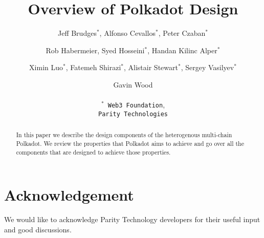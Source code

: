\documentclass{article}
\title{Overview of Polkadot Design}
\author{
  Jeff Brudges$^*$, Alfonso Cevallos$^*$, Peter Czaban$^*$\\
  \and
  Rob Habermeier, Syed Hosseini$^*$, Handan Kilinc Alper$^*$\\
  \and
  Ximin Luo$^*$, Fatemeh Shirazi$^*$, Alistair Stewart$^*$, Sergey Vasilyev$^*$\\
  \and
  Gavin Wood\\
  \\
  \texttt{$^*$ Web3 Foundation},\\
  \texttt{Parity Technologies}
}
\begin{document}
\maketitle

\begin{abstract}
In this paper we describe the design components of the heterogenous multi-chain Polkadot.
We review the properties that Polkadot aims to achieve and go over all the components that are designed to achieve those properties.

\end{abstract}

\tableofcontents
\newpage


 

%

\section*{Acknowledgement}
We would like to acknowledge Parity Technology developers for their useful input and good discussions.

\begin{appendix}

\end{appendix}


\end{document}
